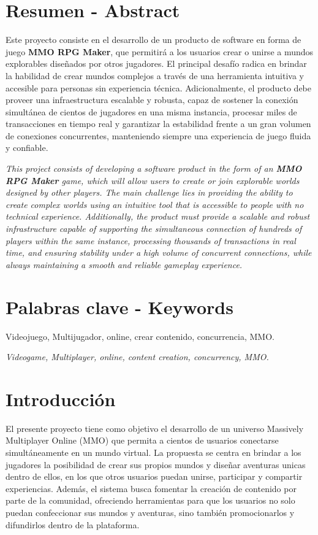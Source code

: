 \section{Resumen - Abstract}

Este proyecto consiste en el desarrollo de un producto de software en forma de juego \textbf{MMO RPG Maker},
que permitirá a los usuarios crear o unirse a mundos explorables diseñados por otros jugadores.
El principal desafío radica en brindar la habilidad de crear mundos complejos a través de una herramienta intuitiva y accesible para personas sin 
experiencia técnica. Adicionalmente, el producto debe proveer una infraestructura escalable y robusta, capaz de sostener la conexión simultánea de cientos de jugadores en una misma instancia,
procesar miles de transacciones en tiempo real y garantizar la estabilidad frente a un gran volumen de conexiones concurrentes,
manteniendo siempre una experiencia de juego fluida y confiable.
\vspace{0.25cm}

\textit{This project consists of developing a software product in the form of an \textbf{MMO RPG Maker} game,
which will allow users to create or join explorable worlds designed by other players.
The main challenge lies in providing the ability to create complex worlds using an intuitive tool that is accessible to people with no technical experience.
Additionally, the product must provide a scalable and robust infrastructure capable of supporting the simultaneous connection of hundreds of players within the same instance,
processing thousands of transactions in real time, and ensuring stability under a high volume of concurrent connections,
while always maintaining a smooth and reliable gameplay experience.}

\section{Palabras clave - Keywords}

Videojuego, Multijugador, online, crear contenido, concurrencia, MMO.
\vspace{0.25cm}

\textit{Videogame, Multiplayer, online, content creation, concurrency, MMO.}

\section{Introducción}

El presente proyecto tiene como objetivo el desarrollo de un universo Massively Multiplayer Online (MMO)
que permita a cientos de usuarios conectarse simultáneamente en un mundo virtual.
La propuesta se centra en brindar a los jugadores la posibilidad de crear sus propios mundos y diseñar aventuras unicas dentro de ellos,
en los que otros usuarios puedan unirse, participar y compartir experiencias. Además, el sistema busca fomentar la creación de contenido por parte de la comunidad,
ofreciendo herramientas para que los usuarios no solo puedan confeccionar sus mundos y aventuras, sino también promocionarlos y difundirlos dentro de la plataforma.

